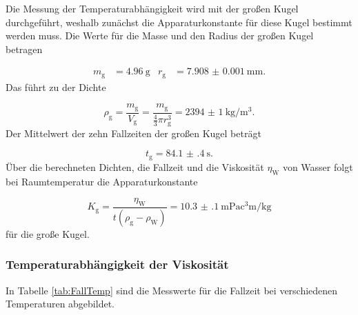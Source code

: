Die Messung der Temperaturabhängigkeit wird mit der großen Kugel durchgeführt,
weshalb zunächst die Apparaturkonstante für diese Kugel bestimmt werden muss.
Die Werte für die Masse und den Radius der großen Kugel betragen

\begin{align}
  m_\text{g} & = \SI{4.96}{\gram} & r_\text{g} & = \SI{7.908(1)}{\milli\meter}.
\end{align}
Das führt zu der Dichte

\begin{equation}
  \rho_\text{g} = \frac{m_\text{g}}{V_\text{g}} = \frac{m_\text{g}}
  {\frac{4}{3}\pi r_\text{g}^3} = \SI{2394(1)}{\kilo\gram\per\cubic\meter}.
\end{equation}
Der Mittelwert der zehn Fallzeiten der großen Kugel beträgt

\begin{equation}
  t_\text{g} = \SI{84.1(4)}{\second}.
\end{equation}
Über die berechneten Dichten, die Fallzeit und die Viskosität $\eta_\text{W}$
von Wasser folgt bei Raumtemperatur die Apparaturkonstante

\begin{equation}
  K_\text{g} = \frac{\eta_\text{W}}{t(\rho_\text{g}-\rho_\text{W})}
  = \SI{10.3(1)}{\milli\pascal\cubic\centi\meter\per\kilo\gram}
\end{equation}
für die große Kugel.

\subsubsection{Temperaturabhängigkeit der Viskosität}

In Tabelle \ref{tab:FallTemp} sind die Messwerte für die Fallzeit
bei verschiedenen Temperaturen abgebildet.

